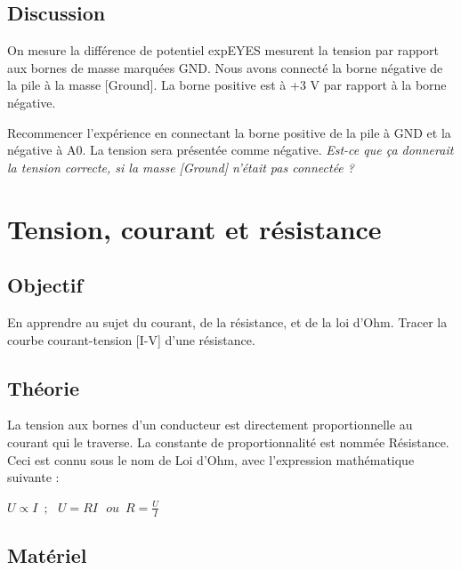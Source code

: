 \documentclass{book}
\begin{document}
\subsection{Discussion}


On mesure la différence de potentiel expEYES mesurent la tension par rapport aux bornes de masse marquées GND. Nous avons connecté la borne négative de la pile à la masse [Ground]. La borne positive est à +3 V par rapport à la borne négative.



Recommencer l'expérience en connectant la borne positive de la pile à GND et la négative à A0. La tension sera présentée comme négative. \emph{Est-ce que ça donnerait la tension correcte, si la masse [Ground] n'était pas connectée ?}







\section{Tension, courant et résistance}



\subsection{Objectif}


En apprendre au sujet du courant, de la résistance, et de la loi d'Ohm. Tracer la courbe courant-tension [I-V] d'une résistance.

\subsection{Théorie}


La tension aux bornes d'un conducteur est directement proportionnelle au courant qui le traverse. La constante de proportionnalité est nommée Résistance. Ceci est connu sous le nom de Loi d'Ohm, avec l'expression mathématique suivante :



$U\varpropto I\,\,\,;\,\,\,\, U=RI\,\,\,\, ou\,\,\, R=\frac{U}{I}$

\subsection{Matériel}
\end{document}
